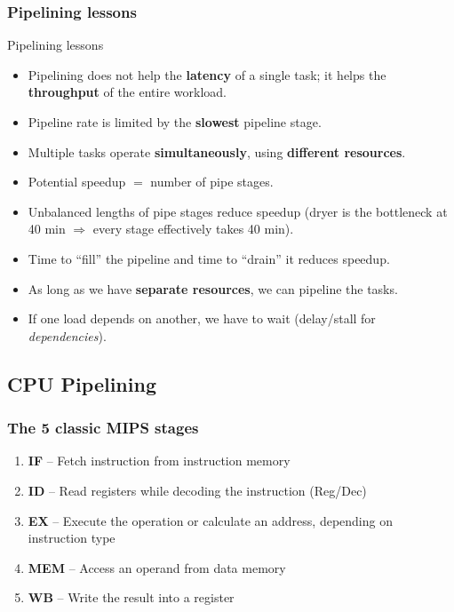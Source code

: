 \subsubsection{Pipelining lessons}

\begin{noot}{Pipelining lessons}
\begin{itemize}
  \item Pipelining does not help the \textbf{latency} of a single task; it
  helps the \textbf{throughput} of the entire workload.
  \item Pipeline rate is limited by the \textbf{slowest} pipeline stage.
  \item Multiple tasks operate \textbf{simultaneously}, using
  \textbf{different resources}.
  \item Potential speedup $=$ number of pipe stages.
  \item Unbalanced lengths of pipe stages reduce speedup (dryer is the
  bottleneck at 40 min $\Rightarrow$ every stage effectively takes 40 min).
  \item Time to ``fill'' the pipeline and time to ``drain'' it reduces
  speedup.
  \item As long as we have \textbf{separate resources}, we can pipeline the
  tasks.
  \item If one load depends on another, we have to wait (delay/stall for
  \emph{dependencies}).
\end{itemize}
\end{noot}

\subsection{CPU Pipelining}

\subsubsection{The 5 classic MIPS stages}

\begin{enumerate}
  \item \textbf{IF} -- Fetch instruction from instruction memory
  \item \textbf{ID} -- Read registers while decoding the instruction
  (Reg/Dec)
  \item \textbf{EX} -- Execute the operation or calculate an address,
  depending on instruction type
  \item \textbf{MEM} -- Access an operand from data memory
  \item \textbf{WB} -- Write the result into a register
\end{enumerate}

